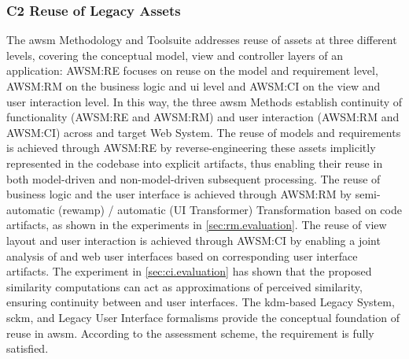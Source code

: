 \subsubsection*{C2 Reuse of Legacy Assets}
The \gls{awsm} Methodology and Toolsuite addresses reuse of  assets at three different levels, covering the conceptual model, view and controller layers of an application: AWSM:RE focuses on reuse on the model and requirement level, AWSM:RM on the business logic and \gls{ui} level and AWSM:CI on the view and user interaction level.
In this way, the three \gls{awsm} Methods establish continuity of functionality (AWSM:RE and AWSM:RM) and user interaction (AWSM:RM and AWSM:CI) across  and target \gls{Web System}.
The reuse of  models and requirements is achieved through AWSM:RE by reverse-engineering these assets implicitly represented in the codebase into explicit \glspl{artifact}, thus enabling their reuse in both model-driven and non-model-driven subsequent processing.
The reuse of business logic and the user interface is achieved through AWSM:RM by semi-automatic (\gls{rewamp}) / automatic (UI Transformer) \gls{Transformation} based on  code \glspl{artifact}, as shown in the experiments in \cref{sec:rm.evaluation}.
The reuse of view layout and user interaction is achieved through AWSM:CI by enabling a joint analysis of  and \gls{web} user interfaces based on corresponding user interface \glspl{artifact}.
The experiment in \cref{sec:ci.evaluation} has shown that the proposed similarity computations can act as approximations of perceived similarity, ensuring continuity between \legacy and \web user interfaces.
The \gls{kdm}-based \gls{Legacy System}, \gls{sckm}, and Legacy User Interface formalisms provide the conceptual foundation of reuse in \gls{awsm}.
According to the assessment scheme, the requirement is fully satisfied.

\vspace{-10pt}
